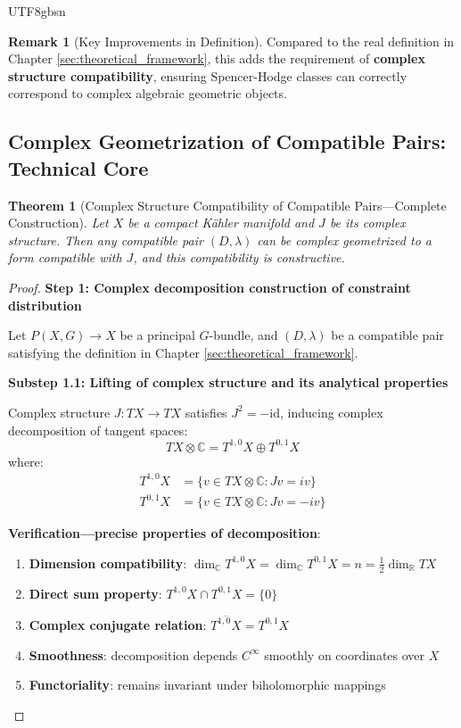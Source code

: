 \documentclass[a4paper,12pt]{extarticle}
\newtheorem{theorem}{Theorem}[section]
\theoremstyle{definition}
\newtheorem{remark}{Remark}[section]
\begin{document}
\begin{CJK}{UTF8}{gbsn}
\begin{remark}[Key Improvements in Definition]
Compared to the real definition in Chapter \ref{sec:theoretical_framework}, this adds the requirement of \textbf{complex structure compatibility}, ensuring Spencer-Hodge classes can correctly correspond to complex algebraic geometric objects.
\end{remark}

\subsection{Complex Geometrization of Compatible Pairs: Technical Core}
\label{subsec:compatible_pair_complexification}

\begin{theorem}[Complex Structure Compatibility of Compatible Pairs—Complete Construction]
\label{thm:compatible_pair_complex_compatibility}
Let $X$ be a compact Kähler manifold and $J$ be its complex structure. Then any compatible pair $(D,\lambda)$ can be complex geometrized to a form compatible with $J$, and this compatibility is constructive.
\end{theorem}

\begin{proof}
\textbf{Step 1: Complex decomposition construction of constraint distribution}

Let $P(X,G) \to X$ be a principal $G$-bundle, and $(D,\lambda)$ be a compatible pair satisfying the definition in Chapter \ref{sec:theoretical_framework}.

\textbf{Substep 1.1: Lifting of complex structure and its analytical properties}

Complex structure $J: TX \to TX$ satisfies $J^2 = -\text{id}$, inducing complex decomposition of tangent spaces:
\begin{equation}
TX \otimes \mathbb{C} = T^{1,0}X \oplus T^{0,1}X
\end{equation}
where:
\begin{align}
T^{1,0}X &= \{v \in TX \otimes \mathbb{C} : Jv = iv\} \\
T^{0,1}X &= \{v \in TX \otimes \mathbb{C} : Jv = -iv\}
\end{align}

\textbf{Verification—precise properties of decomposition}:
\begin{enumerate}
    \item \textbf{Dimension compatibility}: $\dim_{\mathbb{C}} T^{1,0}X = \dim_{\mathbb{C}} T^{0,1}X = n = \frac{1}{2}\dim_{\mathbb{R}} TX$
    \item \textbf{Direct sum property}: $T^{1,0}X \cap T^{0,1}X = \{0\}$
    \item \textbf{Complex conjugate relation}: $\overline{T^{1,0}X} = T^{0,1}X$
    \item \textbf{Smoothness}: decomposition depends $C^\infty$ smoothly on coordinates over $X$
    \item \textbf{Functoriality}: remains invariant under biholomorphic mappings
\end{enumerate}


\end{proof}
\end{CJK}
\end{document}

